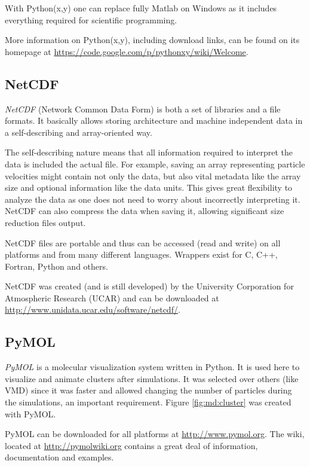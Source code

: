 With Python(x,y) one can replace fully Matlab on Windows as it includes
everything required for scientific programming.

More information on Python(x,y), including download links, can be found on its
homepage at
\url{https://code.google.com/p/pythonxy/wiki/Welcome}.


\subsection*{NetCDF}

\textit{NetCDF} (Network Common Data Form) is both a set of libraries and a file
formats. It basically allows storing architecture and machine independent data
in a self-describing and array-oriented way.

The self-describing nature means that all information required to interpret the
data is included the actual file. For example, saving an array representing
particle velocities might contain not only the data, but also vital metadata
like the array size and optional information like the data units. This gives
great flexibility to analyze the data as one does not need to worry about
incorrectly interpreting it. NetCDF can also compress the data when saving it,
allowing significant size reduction files output.

NetCDF files are portable and thus can be accessed (read and write) on all
platforms and from many different languages. Wrappers exist for C, C++, Fortran,
Python and others.

NetCDF was created (and is still developed) by the University Corporation for
Atmospheric Research (UCAR) and can be downloaded at \\
\url{http://www.unidata.ucar.edu/software/netcdf/}.


\subsection*{PyMOL}

\textit{PyMOL} is a molecular visualization system written in Python.
It is used here to visualize and animate clusters after simulations. It was
selected over others (like VMD) since it was faster and allowed changing the
number of particles during the simulations, an important requirement.
Figure \ref{fig:md:cluster} was created with PyMOL.

PyMOL can be downloaded for all platforms at \url{http://www.pymol.org}. The
wiki, located at \url{http://pymolwiki.org} contains a great deal of information,
documentation and examples.


